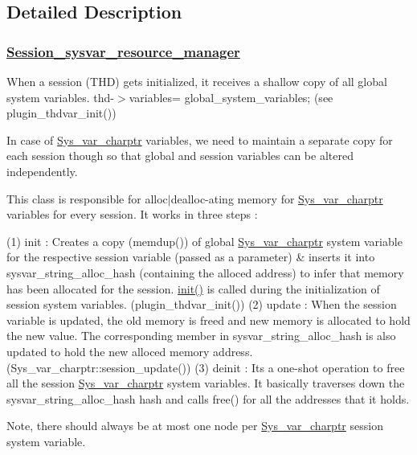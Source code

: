 \subsection{Detailed Description}
\subsubsection*{\mbox{\hyperlink{classSession__sysvar__resource__manager}{Session\+\_\+sysvar\+\_\+resource\+\_\+manager}} }

When a session (T\+HD) gets initialized, it receives a shallow copy of all global system variables. thd-\/$>$variables= global\+\_\+system\+\_\+variables; (see plugin\+\_\+thdvar\+\_\+init())

In case of \mbox{\hyperlink{classSys__var__charptr}{Sys\+\_\+var\+\_\+charptr}} variables, we need to maintain a separate copy for each session though so that global and session variables can be altered independently.

This class is responsible for alloc$\vert$dealloc-\/ating memory for \mbox{\hyperlink{classSys__var__charptr}{Sys\+\_\+var\+\_\+charptr}} variables for every session. It works in three steps \+:

(1) init \+: Creates a copy (memdup()) of global \mbox{\hyperlink{classSys__var__charptr}{Sys\+\_\+var\+\_\+charptr}} system variable for the respective session variable (passed as a parameter) \& inserts it into sysvar\+\_\+string\+\_\+alloc\+\_\+hash (containing the alloced address) to infer that memory has been allocated for the session. \mbox{\hyperlink{classSession__sysvar__resource__manager_ab8b24f45b62c94db75fc79ef34b5b309}{init()}} is called during the initialization of session system variables. (plugin\+\_\+thdvar\+\_\+init()) (2) update \+: When the session variable is updated, the old memory is freed and new memory is allocated to hold the new value. The corresponding member in sysvar\+\_\+string\+\_\+alloc\+\_\+hash is also updated to hold the new alloced memory address. (Sys\+\_\+var\+\_\+charptr\+::session\+\_\+update()) (3) deinit \+: Its a one-\/shot operation to free all the session \mbox{\hyperlink{classSys__var__charptr}{Sys\+\_\+var\+\_\+charptr}} system variables. It basically traverses down the sysvar\+\_\+string\+\_\+alloc\+\_\+hash hash and calls free() for all the addresses that it holds.

Note, there should always be at most one node per \mbox{\hyperlink{classSys__var__charptr}{Sys\+\_\+var\+\_\+charptr}} session system variable. 

